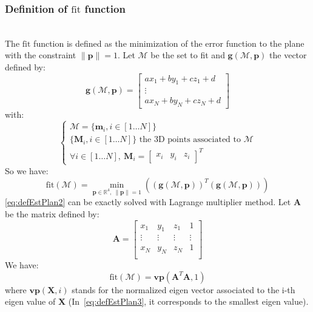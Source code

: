 \documentclass[letterpaper, 10 pt, conference]{ieeeconf}
\begin{document}
\subsubsection{Definition of $\mathrm{fit}$ function}~\\
The $\mathrm{fit}$ function is defined as the minimization of the error function to the plane with the constraint $\|\mathbf{p}\|=1$. Let $\mathcal{M}$ be the set to fit and $\mathbf{g}(\mathcal{M},\mathbf{p})$ the vector defined by:
\begin{equation}
\mathbf{g}(\mathcal{M},\mathbf{p})=
	\begin{bmatrix}
		ax_1 + by_1 + cz_1 +d \\
		\vdots\\
		ax_N + by_N + cz_N + d
	\end{bmatrix}
	\label{eq:defEstPlan1}
\end{equation}
with:
\begin{equation}
	\left\{
		\begin{array}{l}
			\mathcal{M} = \{\mathbf{m}_i,i\in[1\dots N]\}\\
			\{\mathbf{M}_i,i\in[1\dots N]\}\mbox{ the 3D points associated to }\mathcal{M}\\
			\forall i\in[1\dots N],\ \mathbf{M}_i = \begin{bmatrix} x_i & y_i & z_i \end{bmatrix}^T
		\end{array}
	\right.
\end{equation}
So we have:
\begin{equation}
	\mathrm{fit}(\mathcal{M}) = \min_{\mathbf{p}\in\mathbb{R}^4,\ \|\mathbf{p}\|=1}\left(\left(\mathbf{g}(\mathcal{M},\mathbf{p})\right)^T\left(\mathbf{g}(\mathcal{M},\mathbf{p})\right)\right)
	\label{eq:defEstPlan2}
\end{equation}
\eqref{eq:defEstPlan2} can be exactly solved with Lagrange multiplier method. Let $\mathbf{A}$ be the matrix defined by:
\begin{equation}
	\mathbf{A}=
	\begin{bmatrix}
		x_1 & y_1 & z_1 & 1 \\
		\vdots & \vdots & \vdots & \vdots \\
		x_N & y_N & z_N & 1 \\
	\end{bmatrix}
\end{equation}
We have:
\begin{equation}
	\mathrm{fit}(\mathcal{M}) = \mathbf{vp}(\mathbf{A}^T\mathbf{A},1)
	\label{eq:defEstPlan3}
\end{equation}
where  $\mathbf{vp}(\mathbf{X},i)$ stands for the normalized eigen vector associated to the i-th  eigen value of $\mathbf{X}$ (In~\eqref{eq:defEstPlan3}, it corresponds to the smallest eigen value).
\end{document}
